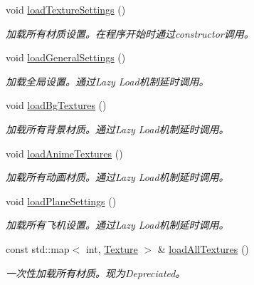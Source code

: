 \begin{DoxyCompactItemize}
void \hyperlink{class_resources_loader_a80e1d1bb8339e48b0becf401f205436e}{load\+Texture\+Settings} ()
\begin{DoxyCompactList}\small\item\em 加载所有材质设置。在程序开始时通过constructor调用。 \end{DoxyCompactList}\item 
\mbox{\label{class_resources_loader_aae8a0b49efa4191ba01cc832c32dbd95}} 
void \hyperlink{class_resources_loader_aae8a0b49efa4191ba01cc832c32dbd95}{load\+General\+Settings} ()
\begin{DoxyCompactList}\small\item\em 加载全局设置。通过\+Lazy Load机制延时调用。 \end{DoxyCompactList}\item 
\mbox{\label{class_resources_loader_a5099528fcfd109b389965e5ebfbdb661}} 
void \hyperlink{class_resources_loader_a5099528fcfd109b389965e5ebfbdb661}{load\+Bg\+Textures} ()
\begin{DoxyCompactList}\small\item\em 加载所有背景材质。通过\+Lazy Load机制延时调用。 \end{DoxyCompactList}\item 
\mbox{\label{class_resources_loader_afd356d180bfc92e6135996b3d290d3ae}} 
void \hyperlink{class_resources_loader_afd356d180bfc92e6135996b3d290d3ae}{load\+Anime\+Textures} ()
\begin{DoxyCompactList}\small\item\em 加载所有动画材质。通过\+Lazy Load机制延时调用。 \end{DoxyCompactList}\item 
\mbox{\label{class_resources_loader_a56b70b8ad03c9fde2736d425adfd97e7}} 
void \hyperlink{class_resources_loader_a56b70b8ad03c9fde2736d425adfd97e7}{load\+Plane\+Settings} ()
\begin{DoxyCompactList}\small\item\em 加载所有飞机设置。通过\+Lazy Load机制延时调用。 \end{DoxyCompactList}\item 
\mbox{\label{class_resources_loader_afe684ff2f1419210e4bbd608c67ffeb3}} 
const std\+::map$<$ int, \hyperlink{struct_texture}{Texture} $>$ \& \hyperlink{class_resources_loader_afe684ff2f1419210e4bbd608c67ffeb3}{load\+All\+Textures} ()
\begin{DoxyCompactList}\small\item\em 一次性加载所有材质。现为\+Depreciated。 \end{DoxyCompactList}\end{DoxyCompactItemize}
